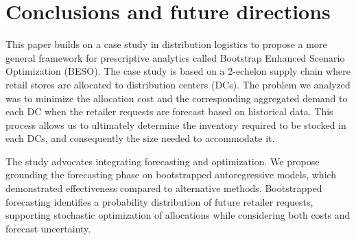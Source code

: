 \documentclass[ijoc,sglanonrev]{informs4}
\begin{document}



\section{Conclusions and future directions} \label{Sec:conclusions}

This paper builds on a case study in distribution logistics to propose a more general framework for prescriptive analytics called Bootstrap Enhanced Scenario Optimization (BESO). The case study is based on a 2-echelon supply chain where retail stores are allocated to distribution centers (DCs). The problem we analyzed was to minimize the allocation cost and the corresponding aggregated demand to each DC when the retailer requests are forecast based on historical data. This process allows us to ultimately determine the inventory required to be stocked in each DCs, and consequently the size needed to accommodate it. 

The study advocates integrating forecasting and optimization. We propose grounding the forecasting phase on bootstrapped autoregressive models, which demonstrated effectiveness compared to alternative methods. Bootstrapped forecasting identifies a probability distribution of future retailer requests, supporting stochastic optimization of allocations while considering both costs and forecast uncertainty. 
\end{document}
